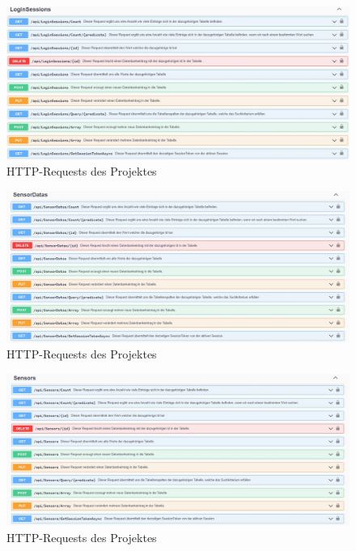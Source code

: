 \begin{figure}[H]
    \centering
    \includegraphics[width=1.6\textwidth]{pics/WebApiRequests6.JPG}
    \caption{HTTP-Requests des Projektes}
\end{figure}

\begin{figure}[H]
    \centering
    \includegraphics[width=1.6\textwidth]{pics/WebApiRequests7.JPG}
    \caption{HTTP-Requests des Projektes}
\end{figure}

\begin{figure}[H]
    \centering
    \includegraphics[width=1.6\textwidth]{pics/WebApiRequests8.JPG}
    \caption{HTTP-Requests des Projektes}
\end{figure}

